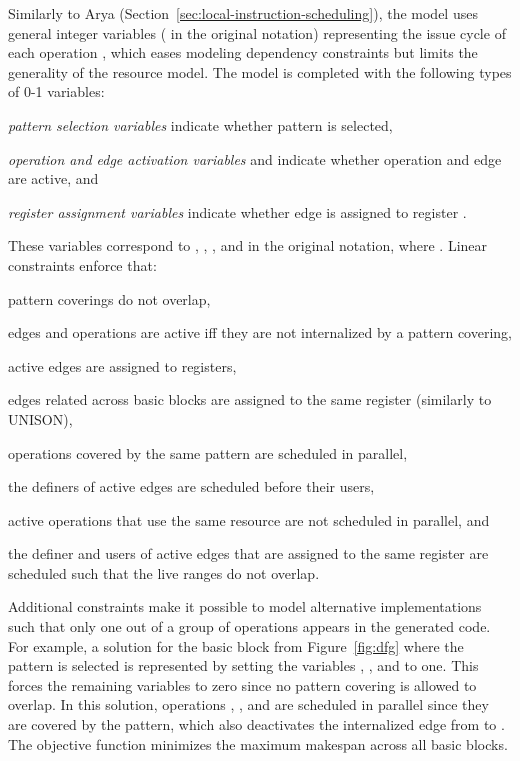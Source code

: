 \documentclass[acmsmall,authorversion,nonacm]{acmart}
\newcommand{\var}[2]{}
\begin{document}
Similarly to Arya (Section~\ref{sec:local-instruction-scheduling}),
the model uses general integer variables \var{c}{o} ( in the
original notation) representing the issue cycle of each operation ,
which eases modeling dependency constraints but limits the generality
of the resource model.
The model is completed with the following types of 0-1 variables:
\begin{inparaitem}[]
\item \emph{pattern selection variables} \var{s}{p} indicate whether
  pattern  is selected,
\item \emph{operation and edge activation variables} \var{a}{o} and
  \var{a}{e} indicate whether operation  and edge  are active,
  and
\item \emph{register assignment variables} \var{a}{e,r}
  indicate whether edge  is assigned to register .
\end{inparaitem}
These variables correspond to , , , and 
in the original notation, where .
Linear constraints enforce that:
\begin{inparaitem}[]
\item pattern coverings do not overlap,
\item edges and operations are active iff they are not internalized by
  a pattern covering,
\item active edges are assigned to registers,
\item edges related across basic blocks are assigned to the same
  register (similarly to UNISON),
\item operations covered by the same pattern are scheduled in
  parallel,
\item the definers of active edges are scheduled before their users,
\item active operations that use the same resource are not scheduled
  in parallel, and
\item the definer and users of active edges that are assigned to the
  same register are scheduled such that the live ranges do not
  overlap.
\end{inparaitem}
Additional constraints make it possible to model alternative
implementations such that only one out of a group of operations
appears in the generated code.
For example, a solution for the basic block from Figure~\ref{fig:dfg}
where the pattern  is selected is represented by
setting the variables \var{s}{\addInstruction{}},
\var{s}{\jumpIfLTInstruction{}}, and \var{s}{\loadPPInstruction{}} to
one.
This forces the remaining \var{s}{p} variables to zero since no
pattern covering is allowed to overlap.
In this solution, operations , , and  are
scheduled in parallel since they are covered by the
 pattern, which also deactivates the
internalized edge from  to .
The objective function minimizes the maximum makespan across all basic
blocks.
\end{document}
